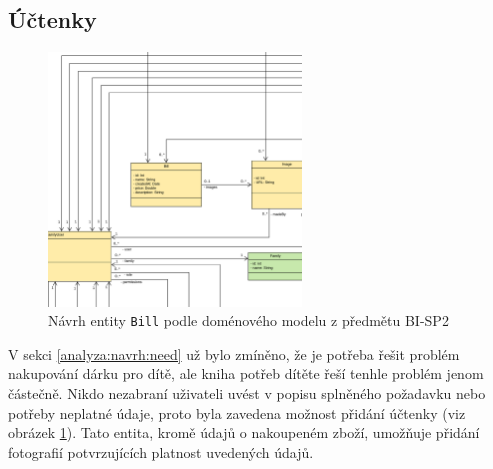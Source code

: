     \subsection{Účtenky}
        \begin{figure}\centering
	        \includegraphics[width=0.6\textwidth]{pdfs/Bill1}
	        \caption[Návrh entity \texttt{Bill}]{Návrh entity \texttt{Bill} podle doménového modelu z předmětu BI-SP2}\label{image:bill1}
        \end{figure}
        V sekci \ref{analyza:navrh:need} už bylo zmíněno, že je potřeba řešit problém nakupování dárku pro dítě, ale kniha potřeb dítěte řeší tenhle problém jenom částečně. Nikdo nezabraní uživateli uvést v popisu splněného požadavku nebo potřeby neplatné údaje, proto byla zavedena možnost přidání účtenky (viz obrázek \ref{image:bill1}). Tato entita, kromě údajů o nakoupeném zboží, umožňuje přidání fotografií potvrzujících platnost uvedených údajů.
    
